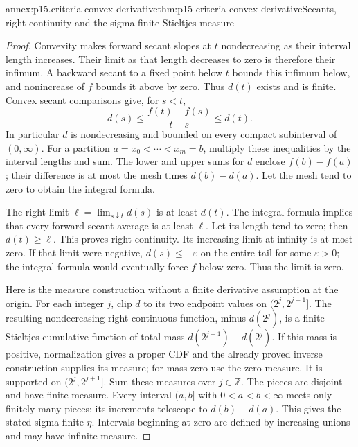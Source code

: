 \begin{annexitem}{annex:p15.criteria-convex-derivative}{thm:p15-criteria-convex-derivative}{Secants, right continuity and the sigma-finite Stieltjes measure}
\begin{proof}
Convexity makes forward secant slopes at \(t\) nondecreasing
as their interval length increases. Their limit as that
length decreases to zero is therefore their infimum.
A backward secant to a fixed point below \(t\) bounds
this infimum below, and nonincrease of \(f\) bounds it
above by zero. Thus \(d(t)\) exists and is finite.
Convex secant comparisons give, for \(s<t\),
\[
 d(s)\leq\frac{f(t)-f(s)}{t-s}\leq d(t).
\]
In particular \(d\) is nondecreasing and bounded on
every compact subinterval of \((0,\infty)\).
For a partition \(a=x_0<\cdots<x_m=b\), multiply these
inequalities by the interval lengths and sum.
The lower and upper sums for \(d\) enclose \(f(b)-f(a)\);
their difference is at most the mesh times \(d(b)-d(a)\).
Let the mesh tend to zero to obtain the integral formula.

The right limit \(\ell=\lim_{s\downarrow t}d(s)\) is at
least \(d(t)\). The integral formula implies that every
forward secant average is at least \(\ell\).
Let its length tend to zero; then \(d(t)\geq\ell\).
This proves right continuity.
Its increasing limit at infinity is at most zero.
If that limit were negative, \(d(s)\leq-\varepsilon\)
on the entire tail for some \(\varepsilon>0\); the
integral formula would eventually force \(f\) below zero.
Thus the limit is zero.

Here is the measure construction without a finite derivative
assumption at the origin. For each integer \(j\), clip
\(d\) to its two endpoint values on
\((2^j,2^{j+1}]\).
The resulting nondecreasing right-continuous function,
minus \(d(2^j)\), is a finite Stieltjes cumulative function
of total mass \(d(2^{j+1})-d(2^j)\).
If this mass is positive, normalization gives a proper
CDF and the already proved inverse construction supplies
its measure; for mass zero use the zero measure.
It is supported on \((2^j,2^{j+1}]\).
Sum these measures over \(j\in\mathbb Z\).
The pieces are disjoint and have finite measure.
Every interval \((a,b]\) with \(0<a<b<\infty\) meets
only finitely many pieces; its increments telescope
to \(d(b)-d(a)\).
This gives the stated sigma-finite \(\eta\).
Intervals beginning at zero are defined by increasing
unions and may have infinite measure.
\end{proof}
\end{annexitem}

